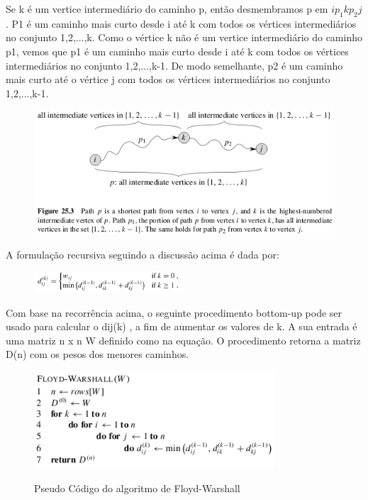 \documentclass[a4paper,12pt]{article}
\begin{document}
Se k é um vertice intermediário do caminho p, então desmembramos p em $ip_1kp_2j$. P1 é um caminho mais curto desde i até k com todos os vértices intermediários no conjunto {1,2,...,k}. Como o vértice k não é um vertice intermediário do caminho p1, vemos que p1 é um caminho mais curto desde i até k com todos os vértices intermediários no conjunto {1,2,...,k-1}. De modo semelhante, p2 é um caminho mais curto até o vértice j com todos os vértices intermediários no conjunto {1,2,...,k-1}. 

\begin{figure}[h!]
	\centering
	\includegraphics[width=1.0\textwidth]{djikstra}
	\label{fig:djikstra}
\end{figure}

A formulação recursiva seguindo a discussão acima é dada por:

\begin{figure}[h!]
	\centering
	\includegraphics[width=0.5\textwidth]{djikstra2}
	\label{fig:djistra_pd}
\end{figure}

Com base na recorrência acima, o  seguinte procedimento bottom-up  pode ser usado para calcular o dij(k) , a fim de aumentar os valores de k. A sua entrada é uma matriz n x n W definido como na equação. O procedimento retorna a matriz D(n) com os pesos dos menores caminhos.

\begin{figure}[h!]
	\centering
	\includegraphics[width=0.8\textwidth]{floyd-warshall}
	\label{fig:floyd-warshall}
	\caption{Pseudo Código do algoritmo de Floyd-Warshall}
\end{figure}
\end{document}
